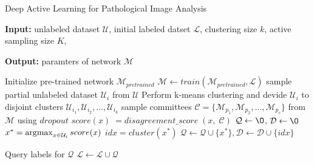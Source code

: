 \begin{algorithm}[h]
    \caption{Deep Active Learning for Pathological Image Analysis}
    \label{algo:dal}
    \begin{algorithmic}
        \STATE \textbf{Input: } 
        unlabeled dataset $\mathcal{U}$,
        initial labeled datset $\mathcal{L}$,
        clustering size $k$, 
        active sampling size $K$,
    \end{algorithmic}

    \begin{algorithmic}
        \STATE \textbf{Output: } paramters of network $\mathcal{M}$
    \end{algorithmic}
    
    \begin{algorithmic}[1]
        \STATE Initialize pre-trained network $\mathcal{M}_{pretrained}$
        \REPEAT
            \STATE $\mathcal{M} \leftarrow train (\mathcal{M}_{pretrained}, \mathcal{L})$
            \STATE sample partial unlabeled dataset $\mathcal{U}_i$ from $\mathcal{U}$
            \STATE Perform k-means clustering and devide $\mathcal{U}_i$ to disjoint clusters $\mathcal{U}_{i_1}, \mathcal{U}_{i_2}, \dots, \mathcal{U}_{i_k}$
            \STATE sample committees $\mathcal{C} = \{\mathcal{M}_{p_1}, \mathcal{M}_{p_2}, \dots, \mathcal{M}_{p_c} \}$ from $\mathcal{M}$ using $dropout$ 
                \STATE $score (x) \; = disagreement\_score \; (x, \; \mathcal{C}) $
            \ENDFOR
            \STATE $\mathcal{Q} \leftarrow \O$, $\mathcal{D} \leftarrow \O$
            \STATE $x^{\ast} = \argmax_{x \in \mathcal{U}_i} score(x)$
            \STATE $idx = cluster(x^{\ast})$
            \STATE $\mathcal{Q} \leftarrow \mathcal{Q} \cup \{x^{\ast}\}, \mathcal{D} \leftarrow \mathcal{D} \cup \{idx\}$

            \ENDIF

            \ENDWHILE
            \STATE Query labels for $\mathcal{Q}$
            \STATE $\mathcal{L} \leftarrow \mathcal{L} \cup \mathcal{Q}$

    \end{algorithmic}
  \end{algorithm}
  